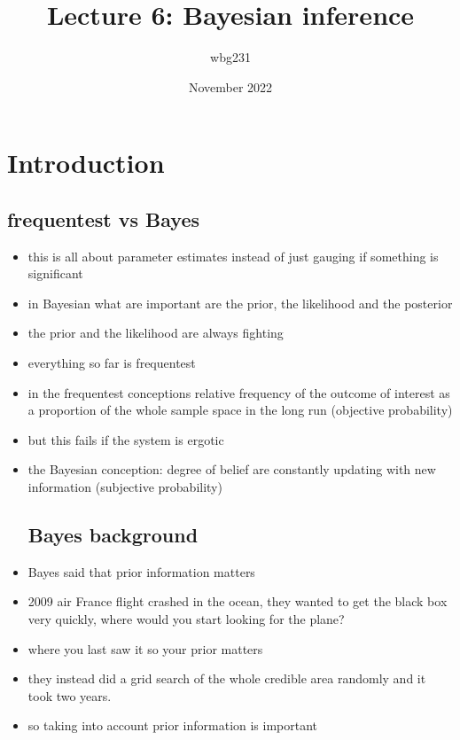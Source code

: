\documentclass{article}
\title{Lecture 6: Bayesian inference }
\author{wbg231 }
\date{November 2022}
\begin{document}
\maketitle

\section{Introduction}
\subsection{frequentest vs Bayes }
\begin{itemize}
\item this is all about parameter estimates instead of just gauging if something is significant
\item in Bayesian what are important are the prior, the likelihood and the posterior
\item the prior and the likelihood are always fighting
\item everything so far is frequentest
\item in the frequentest conceptions relative frequency of the outcome of interest as a proportion of the whole sample space in the long run (objective probability) 
\item but this fails if the system is ergotic 
\item the Bayesian conception: degree of belief are constantly updating with new information (subjective probability)
\subsection{Bayes background}
\item Bayes said that prior information matters
\item 2009 air France flight crashed in the ocean, they wanted to get the black box very quickly, where would you start looking for the plane?
\item where you last saw it so your prior matters
\item they instead did a grid search of the whole credible area randomly and it took two years. 
\item so taking into account prior information is important 

\end{itemize}
\end{document}
